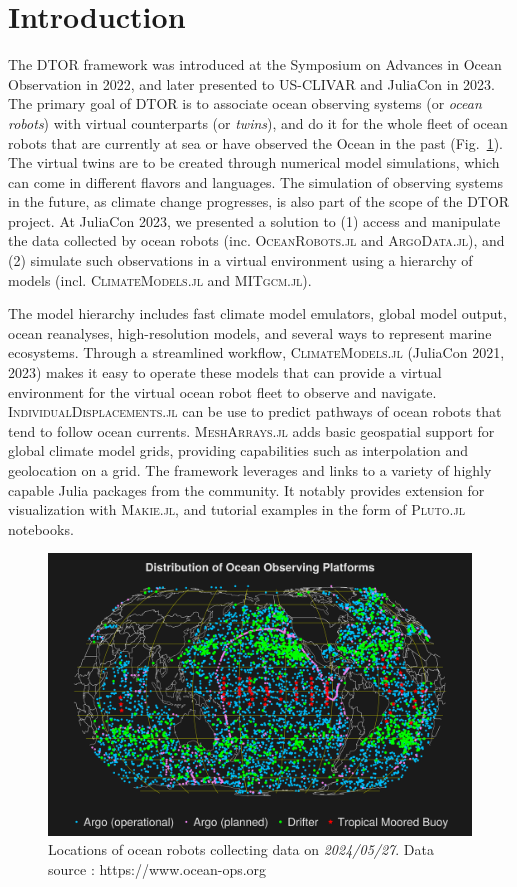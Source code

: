 \documentclass{juliacon}[12pt]
\newcommand{\pkg}[1]{{\small \textsc{#1}}}
\begin{document}
\section{Introduction}

The DTOR framework was introduced at the Symposium on Advances in Ocean Observation in 2022, and later presented to US-CLIVAR and JuliaCon in 2023. The primary goal of DTOR is to associate ocean observing systems (or {\it ocean robots}) with virtual counterparts (or {\it twins}), and do it for the whole fleet of ocean robots that are currently at sea or have observed the Ocean in the past (Fig.~\ref{fig:ocean-ops}). The virtual twins are to be created through numerical model simulations, which can come in different flavors and languages. The simulation of observing systems in the future, as climate change progresses, is also part of the scope of the DTOR project. At JuliaCon 2023, we presented a solution to (1) access and manipulate the data collected by ocean robots (inc. \pkg{OceanRobots.jl} and \pkg{ArgoData.jl}), and (2) simulate such observations in a virtual environment using a hierarchy of models (incl. \pkg{ClimateModels.jl} and \pkg{MITgcm.jl}).

The model hierarchy includes fast climate model emulators, global model output, ocean reanalyses, high-resolution models, and several ways to represent marine ecosystems. Through a streamlined workflow, \pkg{ClimateModels.jl} (JuliaCon 2021, 2023) makes it easy to operate these models that can provide a virtual environment for the virtual ocean robot fleet to observe and navigate. \pkg{IndividualDisplacements.jl} \cite{Forget2021} can be use to predict pathways of ocean robots that tend to follow ocean currents. \pkg{MeshArrays.jl} adds basic geospatial support for global climate model grids, providing capabilities such as interpolation and geolocation on a grid. The framework leverages and links to a variety of highly capable Julia packages from the community. It notably provides extension for visualization with \pkg{Makie.jl}, and tutorial examples in the form of \pkg{Pluto.jl} notebooks.

\begin{figure}[t]
\centerline{\includegraphics[width=\columnwidth]{figs/20240528_OceanOPS.png}}
\caption{Locations of ocean robots collecting data on {\it 2024/05/27}. Data source : https://www.ocean-ops.org}
\label{fig:ocean-ops}
\end{figure}
\end{document}
